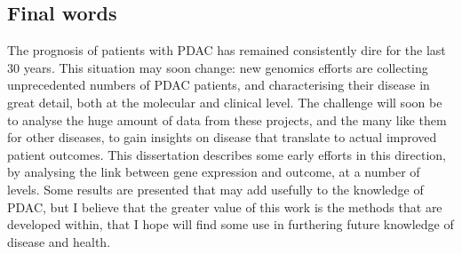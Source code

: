\documentclass[thesis.tex]{subfiles}
\begin{document}
\subsection{Final words}
The prognosis of patients with \gls{PDAC} has remained consistently dire for the last 30 years.  This situation may soon change: new genomics efforts are collecting unprecedented numbers of \gls{PDAC} patients, and characterising their disease in great detail, both at the molecular and clinical level.  The challenge will soon be to analyse the huge amount of data from these projects, and the many like them for other diseases, to gain insights on disease that translate to actual improved patient outcomes.  This dissertation describes some early efforts in this direction, by analysing the link between gene expression and outcome, at a number of levels.  Some results are presented that may add usefully to the knowledge of \gls{PDAC}, but I believe that the greater value of this work is the methods that are developed within, that I hope will find some use in furthering future knowledge of disease and health.
\end{document}
